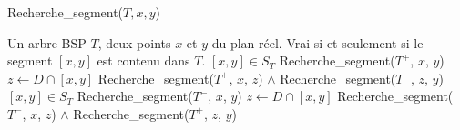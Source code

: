 
\begin{algorithm}
  \caption{Recherche\_segment($T, x, y$)}
  \begin{algorithmic}[1]
    \REQUIRE Un arbre BSP $T$, deux points $x$ et $y$ du plan réel.
    \ENSURE Vrai si et seulement si le segment $[x, y]$ est contenu dans $T$.
    \RETURN $[x, y]\in S_T$
    \ENDIF
      \RETURN Recherche\_segment($T^+$, $x$, $y$)
      \ELSE
      \STATE $z \leftarrow D \cap [x, y]$
      \RETURN Recherche\_segment($T^+$, $x$, $z$) $\land$ Recherche\_segment($T^-$, $z$, $y$)
      \ENDIF
      \ELSE
      \RETURN $[x, y]\in S_T$
      \RETURN Recherche\_segment($T^-$, $x$, $y$)
      \ELSE
      \STATE $z \leftarrow D \cap [x, y]$
      \RETURN Recherche\_segment($T^-$, $x$, $z$) $\land$ Recherche\_segment($T^+$, $z$, $y$)
      \ENDIF
    \ENDIF
  \end{algorithmic}
\end{algorithm}